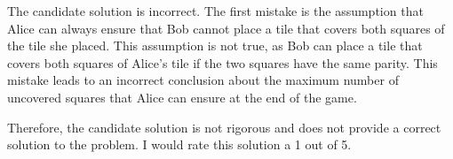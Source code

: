 The candidate solution is incorrect. The first mistake is the assumption that Alice can always ensure that Bob cannot place a tile that covers both squares of the tile she placed. This assumption is not true, as Bob can place a tile that covers both squares of Alice's tile if the two squares have the same parity. This mistake leads to an incorrect conclusion about the maximum number of uncovered squares that Alice can ensure at the end of the game. 

Therefore, the candidate solution is not rigorous and does not provide a correct solution to the problem. I would rate this solution a 1 out of 5.
